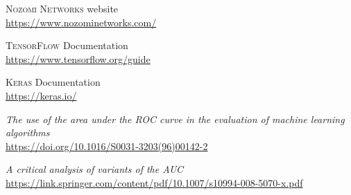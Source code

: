 \begin{thebibliography}{99}
\textsc{Nozomi Networks} website
\\\url{https://www.nozominetworks.com/}

 
\textsc{TensorFlow} Documentation 
\\\url{https://www.tensorflow.org/guide}

\textsc{Keras} Documentation 
\\\url{https://keras.io/}

\textit{The use of the area under the ROC curve in the evaluation of machine learning algorithms}
\\\url{https://doi.org/10.1016/S0031-3203(96)00142-2}

\textit{A critical analysis of variants of the AUC}
\\\url{https://link.springer.com/content/pdf/10.1007/s10994-008-5070-x.pdf}







\end{thebibliography}
